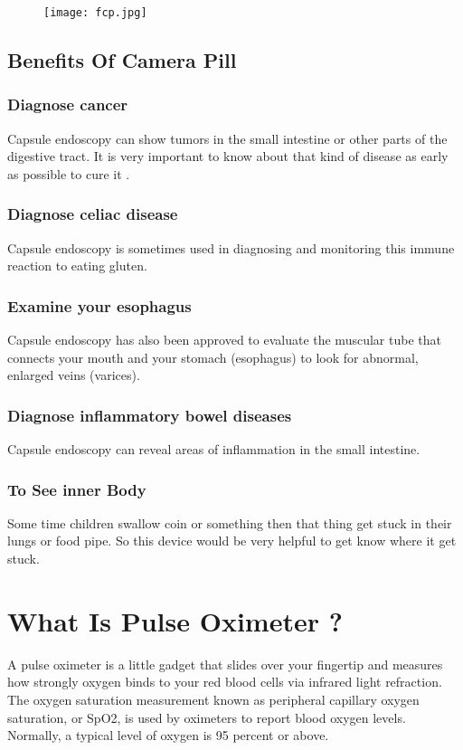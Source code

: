 \documentclass[12pt]{article}
\begin{document}
\begin{figure}[h]
\centering
\texttt{[image: fcp.jpg]}
\end{figure}

\clearpage


\subsection{Benefits Of Camera Pill}


\subsubsection{Diagnose cancer}    Capsule endoscopy can show tumors in the small intestine or other parts of the digestive tract. It is very important to know about that kind of disease as early as possible to cure it .
\subsubsection{Diagnose celiac disease} Capsule endoscopy is sometimes used in diagnosing and monitoring this immune reaction to eating gluten.
\subsubsection{Examine your esophagus}  Capsule endoscopy has also been approved to evaluate the muscular tube that connects your mouth and your stomach (esophagus) to look for abnormal, enlarged veins (varices).
\subsubsection{Diagnose inflammatory bowel diseases} Capsule endoscopy can reveal areas of inflammation in the small intestine.
\subsubsection{To See inner Body } Some time children swallow coin or something then that thing get stuck in their lungs or food pipe. So this device would be very helpful to get know where it get stuck.



\clearpage

\section{What Is Pulse Oximeter ?}
A pulse oximeter is a little gadget that slides over your fingertip and measures how strongly oxygen binds to your red blood cells via infrared light refraction. The oxygen saturation measurement known as peripheral capillary oxygen saturation, or SpO2, is used by oximeters to report blood oxygen levels. Normally, a typical level of oxygen is 95 percent or above. 
\end{document}
